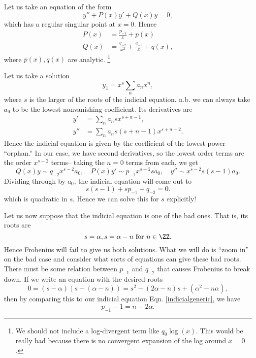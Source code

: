 Let us take an equation of the form
\begin{equation}
    y''+P(x) y' + Q(x) y =0,
\end{equation}
which has a regular singular point at $x=0$. Hence
\begin{align}
    P(x) &= \frac{p_{-1}}{x} + p(x)\\
    Q(x) &= \frac{q_{-2}}{x^2} + \frac{q_{-1}}{x} + q(x),
\end{align}
where $p(x),q(x)$ are analytic.%
    \footnote{We should not include a log-divergent term like $q_0 \log(x)$. This would be really bad because there is no convergent expansion of the log around $x=0$.}

Let us take a solution
\begin{equation}
    y_1 = x^s \sum_n a_n x^n,
\end{equation}
where $s$ is the larger of the roots of the indicial equation. n.b. we can always take $a_0$ to be the lowest nonvanishing coefficient. Its derivatives are
\begin{align}
    y' &= \sum_n a_n s x^{s+n-1},\\
    y'' &= \sum_n a_n s(s+n-1) x^{s+n-2}.
\end{align}
Hence the indicial equation is given by the coefficient of the lowest power ``orphan.'' In our case, we have second derivatives, so the lowest order terms are the order $x^{s-2}$ terms-- taking the $n=0$ terms from each, we get
\begin{equation}
    Q(x) y \sim q_{-2} x^{s-2} a_0,\quad P(x) y' \sim p_{-1} x^{s-2} s a_0, \quad y'' \sim x^{s-2}s (s-1) a_0.
\end{equation}
Dividing through by $a_0$, the indicial equation will come out to
\begin{equation}\label{indicialgeneric}
    s(s-1) + s p_{-1} + q_{-2} =0.
\end{equation}
which is quadratic in $s$. Hence we can solve this for $s$ explicitly!

Let us now suppose that the indicial equation is one of the bad ones. That is, its roots are 
\begin{equation}
    s=\alpha, s=\alpha-n\text{ for }n\in \ZZ.
\end{equation}
Hence Frobenius will fail to give us both solutions. What we will do is ``zoom in'' on the bad case and consider what sorts of equations can give these bad roots. There must be some relation between $p_{-1}$ and $q_{-2}$ that causes Frobenius to break down. If we write an equation with the desired roots
\begin{equation}
    0=(s-\alpha)(s-(\alpha-n)) = s^2 -(2\alpha -n)s +(\alpha^2 -n\alpha),
\end{equation}
then by comparing this to our indicial equation Eqn. \ref{indicialgeneric}, we have
\begin{equation}
    p_{-1} - 1 = n-2\alpha.
\end{equation}